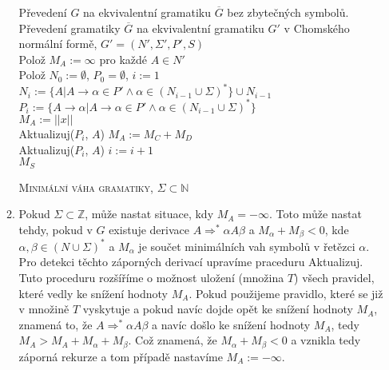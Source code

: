 \documentclass[a4paper,12pt]{article}
\begin{document}
\begin{enumerate}[label=\textbf{\arabic*}.]
\begin{enumerate}
  \begin{algorithm}[H]
 \SetNlSty{}{}{:}
 \SetNlSkip{-1.0em}
 \SetInd{0.5em}{0.5em}
 \BlankLine
 \Indentp{1.4em}
    Převedení $G$ na ekvivalentní gramatiku $\overline{G}$ bez zbytečných symbolů.\\
    Převedení gramatiky $\overline{G}$ na ekvivalentní gramatiku $G'$ v Chomského normální formě, $G' = (N', \Sigma', P', S)$\\
    Polož $M_A := \infty$ pro každé $A \in N'$\\
    Polož $N_0 := \emptyset$, $P_0 = \emptyset$, $i := 1$\\
    {
      $N_i := \{A| A\rightarrow \alpha \in P' \wedge \alpha\in(N_{i-1} \cup \Sigma)^*\} \cup N_{i-1}$\\
      $P_i := \{A \rightarrow \alpha | A \rightarrow \alpha \in P' \wedge \alpha\in(N_{i-1} \cup \Sigma)^*\}$\\
      {
	{
	  $M_A := ||x||$\\
	  Aktualizuj($P_i$, $A$)
	}
	{
	  $M_A := M_C + M_D$\\
	  Aktualizuj($P_i$, $A$)
	}
      }
      $i := i + 1$\\
    }
    \Return $M_S$
 \caption{\textsc{Minimální váha gramatiky, $\Sigma \subset \mathbb{N}$}}
 \label{fastSlam}
\end{algorithm}
\enlargethispage{1em}
  \item Pokud $\Sigma \subset\mathbb{Z}$, může nastat situace, kdy $M_A = -\infty$.
  Toto může nastat tehdy, pokud v $G$ existuje derivace $A\Rightarrow^*\alpha A \beta$ a 
  $M_\alpha + M_\beta < 0$, kde $\alpha, \beta \in (N \cup \Sigma)^*$ a $M_\alpha$ je součet minimálních vah 
  symbolů v řetězci $\alpha$. Pro detekci těchto záporných derivací upravíme praceduru Aktualizuj.
  Tuto proceduru rozšíříme o možnost uložení (množina $T$) všech pravidel, které vedly ke snížení hodnoty $M_A$.
  Pokud použijeme pravidlo, které se již v množině $T$ vyskytuje a pokud navíc dojde opět ke snížení hodnoty $M_A$, 
  znamená to, že $A \Rightarrow^*\alpha A \beta$ a navíc došlo ke snížení hodnoty $M_A$, tedy $M_A > M_A + M_\alpha + M_\beta$.
  Což znamená, že $M_\alpha + M_\beta < 0$ a vznikla tedy záporná rekurze a tom případě nastavíme $M_A := -\infty$.
  

\end{enumerate}
\end{enumerate}
\end{document}
